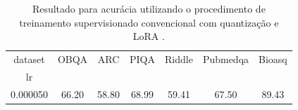 \begin{table}
\caption{Resultado para acurácia utilizando o procedimento de treinamento supervisionado convencional com quantização e LoRA \cite{Hu2021,Dettmers2023}.}
\label{tab:sft:with:lora}
\begin{tabular}{ccccccc}
\toprule
dataset & OBQA & ARC & PIQA & Riddle & Pubmedqa & Bioasq \\
lr &  &  &  &  &  &  \\
\midrule
0.000050 & 66.20 & 58.80 & 68.99 & 59.41 & 67.50 & 89.43 \\
\bottomrule
\end{tabular}
\end{table}
